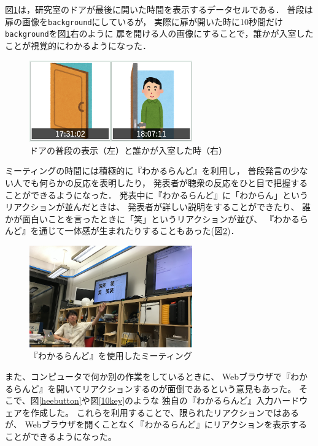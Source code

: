図\ref{door}は，研究室のドアが最後に開いた時間を表示するデータセルである．
普段は扉の画像を\texttt{background}にしているが，
実際に扉が開いた時に10秒間だけ\texttt{background}を図\ref{door}右のように
扉を開ける人の画像にすることで，誰かが入室したことが視覚的にわかるようになった．

\begin{figure}[h]
\centering
\includegraphics[width=7cm]{images/door.png}
\caption{ドアの普段の表示（左）と誰かが入室した時（右）}
\label{door}
\end{figure}

ミーティングの時間には積極的に『わかるらんど』を利用し，
普段発言の少ない人でも何らかの反応を表明したり，
発表者が聴衆の反応をひと目で把握することができるようになった．
発表中に『わかるらんど』に「わからん」というリアクションが並んだときは、
発表者が詳しい説明をすることができたり、
誰かが面白いことを言ったときに「笑」というリアクションが並び、
『わかるらんど』を通じて一体感が生まれたりすることもあった(図\ref{wara})．

\begin{figure}[h]
\centering
\includegraphics[width=7cm]{images/wara.png}
\caption{『わかるらんど』を使用したミーティング}
\label{wara}
\end{figure}

また、コンピュータで何か別の作業をしているときに、
Webブラウザで『わかるらんど』を開いてリアクションするのが面倒であるという意見もあった。
そこで、図\ref{heebutton}や図\ref{10key}のような
独自の『わかるらんど』入力ハードウェアを作成した。
これらを利用することで、限られたリアクションではあるが、
Webブラウザを開くことなく『わかるらんど』にリアクションを表示することができるようになった。

